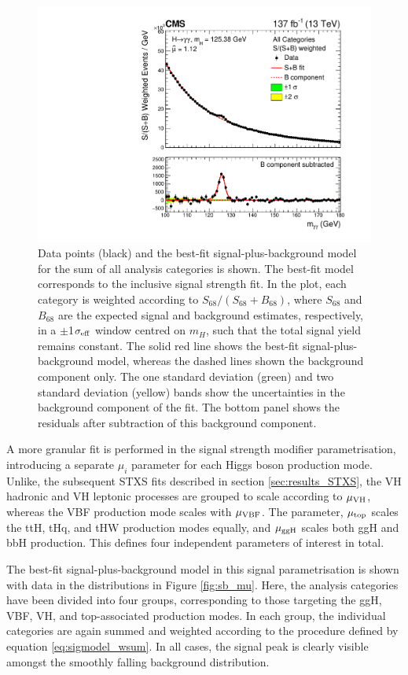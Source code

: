 \begin{figure}[htb]
  \centering
  \includegraphics[width=.6\textwidth]{Figures/hgg_results/sPlusBweighted.pdf}
  \caption[Observed diphoton mass distribution for the sum of all analysis categories]
  {
    Data points (black) and the best-fit signal-plus-background model for the sum of all analysis categories is shown. The best-fit model corresponds to the inclusive signal strength fit. In the plot, each category is weighted according to $S_{68}/(S_{68}+B_{68})$, where $S_{68}$ and $B_{68}$ are the expected signal and background estimates, respectively, in a $\pm$1$\sigma_{\rm{eff}}$ window centred on $m_H$, such that the total signal yield remains constant. The solid red line shows the best-fit signal-plus-background model, whereas the dashed lines shown the background component only. The one standard deviation (green) and two standard deviation (yellow) bands show the uncertainties in the background component of the fit. The bottom panel shows the residuals after subtraction of this background component.
  }
  \label{fig:sb_inclusive}
\end{figure}

A more granular fit is performed in the signal strength modifier parametrisation, introducing a separate $\mu_i$ parameter for each Higgs boson production mode. Unlike, the subsequent STXS fits described in section \ref{sec:results_STXS}, the VH hadronic and VH leptonic processes are grouped to scale according to $\mu_{\rm{VH}}$, whereas the VBF production mode scales with $\mu_{\rm{VBF}}$. The parameter, $\mu_{\rm{top}}$ scales the ttH, tHq, and tHW production modes equally, and $\mu_{\rm{ggH}}$ scales both ggH and bbH production. This defines four independent parameters of interest in total.

The best-fit signal-plus-background model in this signal parametrisation is shown with data in the \mgg distributions in Figure \ref{fig:sb_mu}. Here, the analysis categories have been divided into four groups, corresponding to those targeting the ggH, VBF, VH, and top-associated production modes. In each group, the individual categories are again summed and weighted according to the procedure defined by equation \ref{eq:sigmodel_wsum}. In all cases, the signal peak is clearly visible amongst the smoothly falling background distribution.

